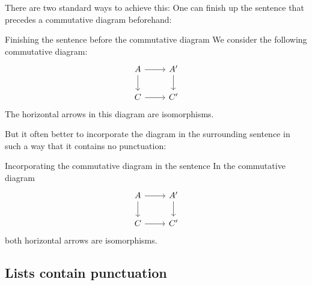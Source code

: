 There are two standard ways to achieve this:
One can finish up the sentence that precedes a commutative diagram beforehand:
\begin{showlatex}{Finishing the sentence before the commutative diagram}
  We consider the following commutative diagram:
  \[
    \begin{tikzcd}
        A
        \arrow{r}
        \arrow{d}
      &
        A'
        \arrow{d}
      \\
        C
        \arrow{r}
      &
        C'  
    \end{tikzcd}
  \]
  The horizontal arrows in this diagram are isomorphisms.
\end{showlatex}
But it often better to incorporate the diagram in the surrounding sentence in such a way that it contains no punctuation:
\begin{showlatex}{Incorporating the commutative diagram in the sentence}
  In the commutative diagram
    \[
    \begin{tikzcd}
        A
        \arrow{r}
        \arrow{d}
      &
        A'
        \arrow{d}
      \\
        C
        \arrow{r}
      &
        C'  
    \end{tikzcd}
  \]
  both horizontal arrows are isomorphisms.
\end{showlatex}




\subsection{Lists contain punctuation}

